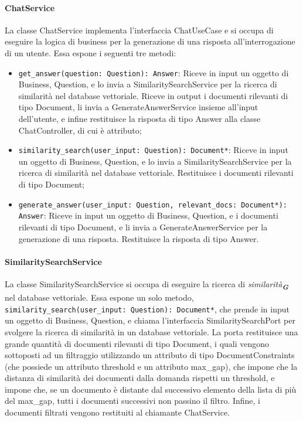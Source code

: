 \paragraph{ChatService}
\label{sec:chat_service}
La classe ChatService implementa l'interfaccia ChatUseCase e si occupa di eseguire la logica di business per la generazione di una risposta all'interrogazione di un utente.
Essa espone i seguenti tre metodi:
\begin{itemize}
    \item \texttt{get\_answer(question: Question): Answer}: Riceve in input un oggetto di Business, Question, e lo invia a SimilaritySearchService per la ricerca di similarità nel database vettoriale. Riceve in output i documenti rilevanti di tipo Document, li invia a GenerateAnswerService insieme all'input dell'utente, e infine restituisce la risposta di tipo Answer alla classe ChatController, di cui è attributo;
    \item \texttt{similarity\_search(user\_input: Question): Document*}: Riceve in input un oggetto di Business, Question, e lo invia a SimilaritySearchService per la ricerca di similarità nel database vettoriale. Restituisce i documenti rilevanti di tipo Document;
    \item \texttt{generate\_answer(user\_input: Question, relevant\_docs: Document*): Answer}: Riceve in input un oggetto di Business, Question, e i documenti rilevanti di tipo Document, e li invia a GenerateAnswerService per la generazione di una risposta. Restituisce la risposta di tipo Answer.
\end{itemize}

\paragraph{SimilaritySearchService}
\label{sec:similarity_search_service}
La classe SimilaritySearchService si occupa di eseguire la ricerca di \emph{similarità}\textsubscript{\textbf{\textit{G}}} nel database vettoriale. Essa espone un solo metodo, \texttt{similarity\_search(user\_input: Question): Document*}, che prende in input un oggetto di Business, Question, e chiama l'interfaccia SimilaritySearchPort per svolgere la ricerca di similarità in un database vettoriale. La porta restituisce una grande quantità di documenti rilevanti di tipo Document, i quali vengono sottoposti ad un filtraggio utilizzando un attributo di tipo DocumentConstraints (che possiede un attributo threshold e un attributo max\_gap), che impone che la distanza di similarità dei documenti dalla domanda rispetti un threshold, e impone che, se un documento è distante dal successivo elemento della lista di più del max\_gap, tutti i documenti successivi non passino il filtro. Infine, i documenti filtrati vengono restituiti al chiamante ChatService.

